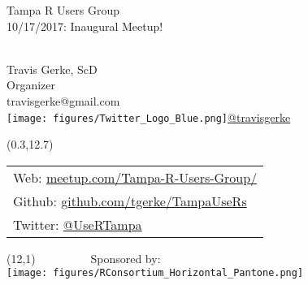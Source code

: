 \documentclass{beamer}
\begin{document}
\begin{frame}
\vspace{4cm}
\begin{center}
\normalsize{Tampa R Users Group}\\
\normalsize{10/17/2017: Inaugural Meetup!}\\
\vspace{.2cm}~
\vspace{1cm}
\end{center}

\vspace{.2cm}
\begin{flushright}
\scriptsize{Travis Gerke, ScD}\\
\tiny{Organizer}\\
\tiny{travisgerke@gmail.com}\\
\texttt{[image: figures/Twitter\_Logo\_Blue.png]}\tiny{\href{https://twitter.com/travisgerke}{@travisgerke}}\\
\vspace{.11cm}
\end{flushright}

\begin{textblock}{6}(0.3,12.7)
\scriptsize{
\begin{table}[h]
\centering
\begin{tabular}{l}
Web: \href{https://www.meetup.com/Tampa-R-Users-Group/}{meetup.com/Tampa-R-Users-Group/}\\
Github: \href{https://github.com/tgerke/TampaUseRs}{github.com/tgerke/TampaUseRs}\\
Twitter: \href{https://twitter.com/usertampa}{@UseRTampa}\\
\end{tabular}
\end{table}
}
\end{textblock}

\begin{textblock}{6}(12,1)
\tiny{~~~~~~~~~Sponsored by:}\\
\texttt{[image: figures/RConsortium\_Horizontal\_Pantone.png]}
\end{textblock}

\end{frame}
\end{document}
